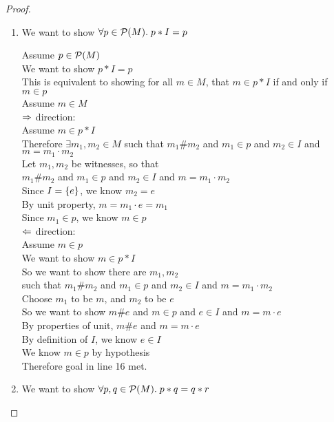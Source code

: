 \begin{proof}
\begin{enumerate}
\item We want to show $\forall p \in \mathcal{P}(M).\; p * I = p$
  \begin{tabbedproof}
    \oo Assume $p \in \mathcal{P}(M)$ \\
    \ooo We want to show $p * I = p$ \\ 
    \ooo This is equivalent to showing for all $m \in M$, that $m \in p * I$ if and only if $m \in p$ \\
    \ooo Assume $m \in M$ \\
    \oooo $\Rightarrow$ direction: \\
    \ooooo Assume $m \in p * I$ \\
    \ooooo Therefore $\exists m_1, m_2 \in M$ such that $m_1 \# m_2$ and $m_1 \in p$ and $m_2 \in I$ and $m = m_1 \cdot m_2$\\
    \ooooo Let $m_1, m_2$ be witnesses, so that \\
    \oooooo $m_1 \# m_2$ and $m_1 \in p$ and $m_2 \in I$ and $m = m_1 \cdot m_2$\\
    \oooooo Since $I = \{{e}\}$, we know $m_2 = e$ \\
    \oooooo By unit property, $m = m_1 \cdot e = m_1$ \\
    \oooooo Since $m_1 \in p$, we know $m \in p$ \\
    \ooo $\Leftarrow$ direction: \\
    \oooo Assume $m \in p$ \\
    \ooooo We want to show $m \in p * I$ \\ 
    \ooooo So we want to show there are $m_1, m_2$ \\
    \ooooox such that $m_1 \# m_2$ and $m_1 \in p$ and $m_2 \in I$ and $m = m_1 \cdot m_2$ \\
    \ooooo Choose $m_1$ to be $m$, and $m_2$ to be $e$ \\
    \ooooo So we want to show $m \# e$ and $m \in p$ and $e \in I$ and $m = m \cdot e$ \\
    \ooooo By properties of unit, $m \# e$ and $m = m \cdot e$ \\
    \ooooo By definition of $I$, we know $e \in I$ \\
    \ooooo We know $m \in p$ by hypothesis \\
    \ooooo Therefore goal in line 16 met. \\ 
  \end{tabbedproof}

\item We want to show $\forall p, q \in \mathcal{P}(M).\; p * q = q * r$


\end{enumerate}
\end{proof}
